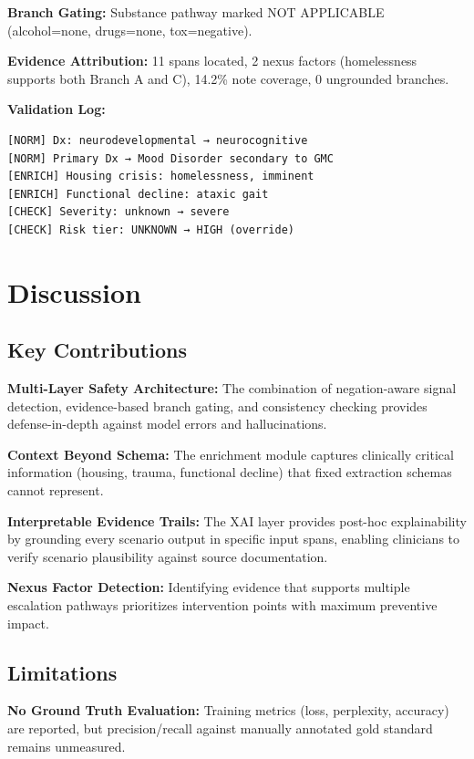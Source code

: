 \documentclass[conference]{IEEEtran}
\begin{document}
\textbf{Branch Gating:} Substance pathway marked NOT APPLICABLE (alcohol=none, drugs=none, tox=negative).

\textbf{Evidence Attribution:} 11 spans located, 2 nexus factors (homelessness supports both Branch A and C), 14.2\% note coverage, 0 ungrounded branches.

\textbf{Validation Log:}
\begin{verbatim}
[NORM] Dx: neurodevelopmental → neurocognitive
[NORM] Primary Dx → Mood Disorder secondary to GMC
[ENRICH] Housing crisis: homelessness, imminent
[ENRICH] Functional decline: ataxic gait
[CHECK] Severity: unknown → severe
[CHECK] Risk tier: UNKNOWN → HIGH (override)
\end{verbatim}

\section{Discussion}

\subsection{Key Contributions}

\textbf{Multi-Layer Safety Architecture:} The combination of negation-aware signal detection, evidence-based branch gating, and consistency checking provides defense-in-depth against model errors and hallucinations.

\textbf{Context Beyond Schema:} The enrichment module captures clinically critical information (housing, trauma, functional decline) that fixed extraction schemas cannot represent.

\textbf{Interpretable Evidence Trails:} The XAI layer provides post-hoc explainability by grounding every scenario output in specific input spans, enabling clinicians to verify scenario plausibility against source documentation.

\textbf{Nexus Factor Detection:} Identifying evidence that supports multiple escalation pathways prioritizes intervention points with maximum preventive impact.

\subsection{Limitations}

\textbf{No Ground Truth Evaluation:} Training metrics (loss, perplexity, accuracy) are reported, but precision/recall against manually annotated gold standard remains unmeasured.
\end{document}
